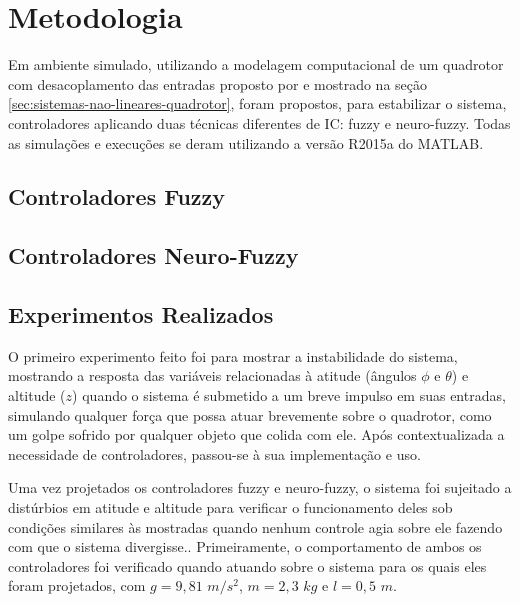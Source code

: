 %
%

\chapter{Metodologia}
\label{chap:metodologia}

Em ambiente simulado, utilizando a modelagem computacional de um quadrotor com desacoplamento das entradas proposto por  e mostrado na seção \ref{sec:sistemas-nao-lineares-quadrotor}, foram propostos, para estabilizar o sistema, controladores aplicando duas técnicas diferentes de IC: fuzzy e neuro-fuzzy. Todas as simulações e execuções se deram utilizando a versão R2015a do MATLAB.

\section{Controladores Fuzzy}
\label{sec:controlador-fuzzy}



\section{Controladores Neuro-Fuzzy}
\label{sec:controlador-neuro-fuzzy}



\section{Experimentos Realizados}
\label{sec:experimentos-realizados}

O primeiro experimento feito foi para mostrar a instabilidade do sistema, mostrando a resposta das variáveis relacionadas à atitude (ângulos $\phi$ e $\theta$) e altitude ($z$) quando o sistema é submetido a um breve impulso em suas entradas, simulando qualquer força que possa atuar brevemente sobre o quadrotor, como um golpe sofrido por qualquer objeto que colida com ele. Após contextualizada a necessidade de controladores, passou-se à sua implementação e uso.

Uma vez projetados os controladores fuzzy e neuro-fuzzy, o sistema foi sujeitado a distúrbios em atitude e altitude para verificar o funcionamento deles sob condições similares às mostradas quando nenhum controle agia sobre ele fazendo com que o sistema divergisse.. Primeiramente, o comportamento de ambos os controladores foi verificado quando atuando sobre o sistema para os quais eles foram projetados, com $g=9,81$ $m/s^2$, $m=2,3$ $kg$ e $l=0,5$ $m$. 

